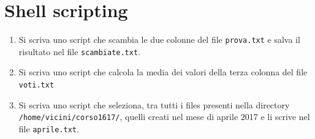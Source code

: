 \documentclass[12pt]{article}
\begin{document}
\clearpage







\section{Shell scripting}

\begin{enumerate}
\item
Si scriva uno script che scambia le due colonne del file {\tt prova.txt} e salva il risultato nel file {\tt scambiate.txt}.
\item
Si scriva uno script che calcola la media dei valori della terza colonna del file {\tt voti.txt}
\item
Si scriva uno script che seleziona, tra tutti i files presenti nella directory
{\tt /home/vicini/corso1617/}, quelli creati nel mese di aprile 2017 e li scrive nel file {\tt aprile.txt}.

\end{enumerate}
\end{document}
